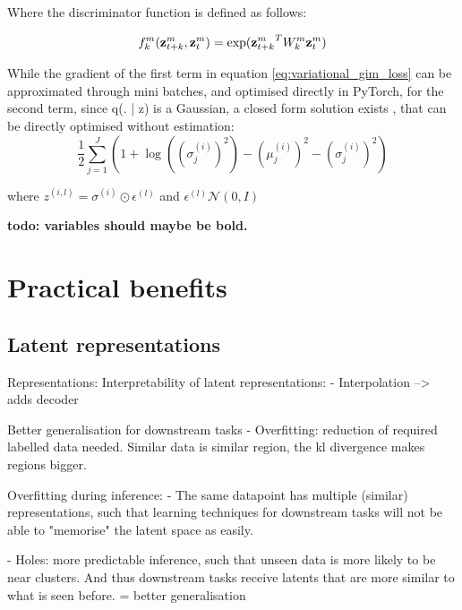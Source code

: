 	Where the discriminator function is defined as follows:
	
	$$ f_k^m(\mathbf{z}_{t+k}^m,\mathbf{z}_t^m) = \exp({\mathbf{z}_{t+k}^m}^TW_k^m\mathbf{z}_t^m) $$

	While the gradient of the first term in equation \ref{eq:variational_gim_loss} can be approximated through mini batches, and optimised directly in PyTorch, for the second term, since q(. | z) is a Gaussian, a closed form solution exists \cite{kingmaAutoEncodingVariationalBayes2022}, that can be directly optimised without estimation:
	\begin{equation}
		\frac{1}{2}\sum_{j=1}^J \left( 1 + \log((\sigma_j^{(i)})^2) - (\mu_j^{(i)})^2 - (\sigma_j^{(i)})^2 \right) 
	\end{equation}


	
	where $z^(i,l) = \sigma ^{(i)} \odot \epsilon^{(l)}$ and $\epsilon^(l) \mathcal{N}(0, I)$

	\textbf{todo: variables should maybe be bold.}
	
	
	
	
	
	
\section{Practical benefits}

\subsection{Latent representations}
	Representations:
		Interpretability of latent representations:
			- Interpolation --> adds decoder
	
	Better generalisation for downstream tasks
		- Overfitting: reduction of required labelled data needed. Similar data is similar region, the kl divergence makes regions bigger.

		Overfitting during inference:
		- The same datapoint has multiple (similar) representations, such that learning techniques for downstream tasks will not be able to "memorise" the latent space as easily.
		
		- Holes: more predictable inference, such that unseen data is more likely to be near clusters. And thus downstream tasks receive latents that are more similar to what is seen before.
		= better generalisation

